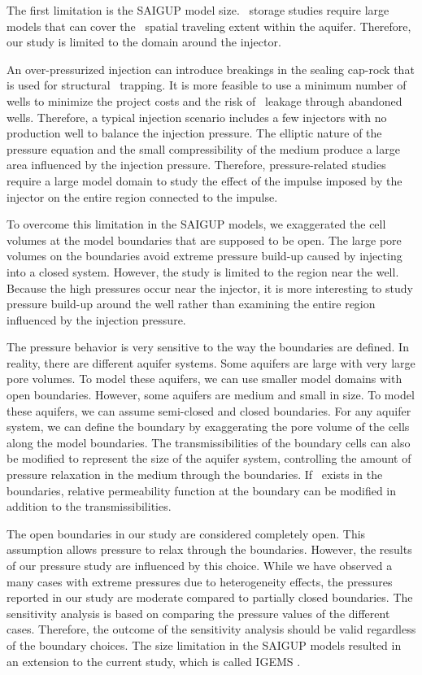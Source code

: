 The first limitation is the SAIGUP model size. \coo\ storage studies require large models that can cover the \coo\ spatial traveling extent within the aquifer. Therefore, our study is limited to the domain around the injector.

An over-pressurized injection can introduce breakings in the sealing cap-rock that is used for structural \coo\ trapping. It is more feasible to use a minimum number of wells to minimize the project costs and the risk of \coo\ leakage through abandoned wells. Therefore, a typical injection scenario includes a few injectors with no production well to balance the injection pressure. The elliptic nature of the pressure equation and the small compressibility of the medium produce a large area influenced by the injection pressure. Therefore, pressure-related studies require a large model domain to study the effect of the impulse imposed by the injector on the entire region connected to the impulse.

To overcome this limitation in the SAIGUP models, we exaggerated the cell volumes at the model boundaries that are supposed to be open. The large pore volumes on the boundaries avoid extreme pressure build-up caused by injecting into a closed system. However, the study is limited to the region near the well. Because the high pressures occur near the injector, it is more interesting to study pressure build-up around the well rather than examining the entire region influenced by the injection pressure.

The pressure behavior is very sensitive to the way the boundaries are defined. In reality, there are different aquifer systems. Some aquifers are large with very large pore volumes. To model these aquifers, we can use smaller model domains with open boundaries. However, some aquifers are medium and small in size. To model these aquifers, we can assume semi-closed and closed boundaries. For any aquifer system, we can define the boundary by exaggerating the pore volume of the cells along the model boundaries. The transmissibilities of the boundary cells can also be modified to represent the size of the aquifer system, controlling the amount of pressure relaxation in the medium through the boundaries. If \coo\ exists in the boundaries, relative permeability function at the boundary can be modified in addition to the transmissibilities. 

The open boundaries in our study are considered completely open. This assumption allows pressure to relax through the boundaries. However, the results of our pressure study are influenced by this choice. While we have observed a many cases with extreme pressures due to heterogeneity effects, the pressures reported in our study are moderate compared to partially closed boundaries. The sensitivity analysis is based on comparing the pressure values of the different cases. Therefore, the outcome of the sensitivity analysis should be valid regardless of the boundary choices. The size limitation in the SAIGUP models resulted in an extension to the current study, which is called IGEMS \cite{syversveenstudy}. 

